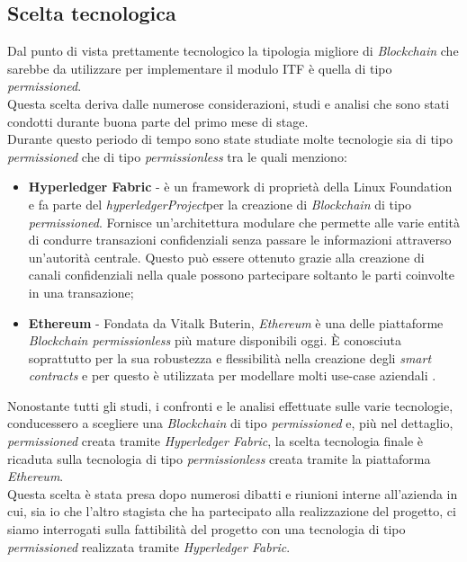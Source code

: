 \subsection{Scelta tecnologica}
Dal punto di vista prettamente tecnologico la tipologia migliore di \textit{Blockchain} che sarebbe da utilizzare per implementare il modulo \gls{ITF} è quella di tipo \textit{permissioned}.\\
Questa scelta deriva dalle numerose considerazioni, studi e analisi che sono stati condotti durante buona parte del primo mese di stage.\\
Durante questo periodo di tempo sono state studiate molte tecnologie sia di tipo \textit{permissioned} che di tipo \textit{permissionless} tra le quali menziono:
\begin{itemize}
	\item \textbf{Hyperledger Fabric} - è un framework di proprietà della Linux Foundation \cite{linuxFoundation} e fa parte del \emph{\gls{hyperledgerProject}}\glsfirstoccur per la creazione di \textit{Blockchain} di tipo \textit{permissioned}. Fornisce un'architettura modulare che permette alle varie entità di condurre transazioni confidenziali senza passare le informazioni attraverso un'autorità centrale. Questo può essere ottenuto grazie alla creazione di canali confidenziali nella quale possono partecipare soltanto le parti coinvolte in una transazione;
	\item \textbf{Ethereum} - Fondata da Vitalk Buterin, \textit{Ethereum} è una delle piattaforme \textit{Blockchain permissionless} più mature disponibili oggi.
	È conosciuta soprattutto per la sua robustezza e flessibilità nella creazione degli \textit{smart contracts} e per questo è utilizzata per modellare molti use-case aziendali \cite{ethereumProject}.
\end{itemize}
Nonostante tutti gli studi, i confronti e le analisi effettuate sulle varie tecnologie, conducessero a scegliere una \textit{Blockchain} di tipo \textit{permissioned} e, più nel dettaglio, \textit{permissioned} creata tramite \textit{Hyperledger Fabric}, la scelta tecnologia finale è ricaduta sulla tecnologia di tipo \textit{permissionless} creata tramite la piattaforma \textit{Ethereum}.\\
Questa scelta è stata presa dopo numerosi dibatti e riunioni interne all'azienda in cui, sia io che l'altro stagista che ha partecipato alla realizzazione del progetto, ci siamo interrogati sulla fattibilità del progetto con una tecnologia di tipo \textit{permissioned} realizzata tramite \textit{Hyperledger Fabric}.\\
